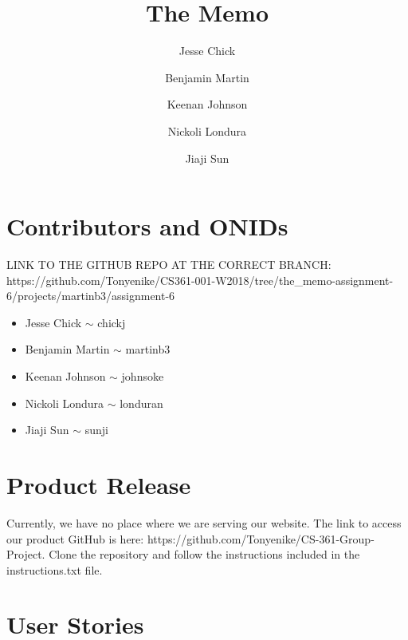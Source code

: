 \documentclass[12pt]{article}
\title{The Memo}
\author{Jesse Chick\\
\and Benjamin Martin\\
\and Keenan Johnson\\
\and Nickoli Londura\\
\and Jiaji Sun}
\begin{document}
\maketitle
\tableofcontents

\section{Contributors and ONIDs}
\par
LINK TO THE GITHUB REPO AT THE CORRECT BRANCH: https://github.com/Tonyenike/CS361-001-W2018/tree/the\_memo-assignment-6/projects/martinb3/assignment-6

\begin{itemize}
	\item Jesse Chick $\sim$ chickj
	\item Benjamin Martin $\sim$ martinb3
	\item Keenan Johnson $\sim$ johnsoke
	\item Nickoli Londura $\sim$ londuran
	\item Jiaji Sun $\sim$ sunji
\end{itemize}

\section{Product Release}

\par Currently, we have no place where we are serving our website. The link to access our product GitHub is here: https://github.com/Tonyenike/CS-361-Group-Project. Clone the repository and follow the instructions included in the instructions.txt file. \\

\section{User Stories}
\end{document}
